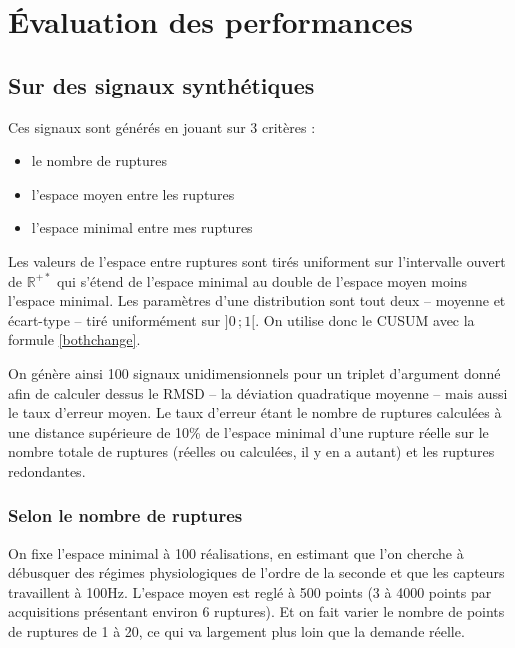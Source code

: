 \documentclass[french,11pt,notitlepage]{report}
\begin{document}
	\chapter{Évaluation des performances}
	
	
	
	\section{Sur des signaux synthétiques}
	
	Ces signaux sont générés en jouant sur 3 critères :
	
	\begin{itemize}
	\item le nombre de ruptures
	\item l'espace moyen entre les ruptures
	\item l'espace minimal entre mes ruptures\\
	\end{itemize}
	
	Les valeurs de l'espace entre ruptures sont tirés uniforment sur l'intervalle ouvert de $\mathbb R^{+*}$ qui s'étend de l'espace minimal au double de l'espace moyen moins l'espace minimal.
	Les paramètres d'une distribution sont tout deux -- moyenne et écart-type -- tiré uniformément sur $]0\,;1[$.
	On utilise donc le CUSUM avec la formule \ref{bothchange}.
	
	On génère ainsi 100 signaux unidimensionnels pour un triplet d'argument donné afin de calculer dessus le RMSD -- la déviation quadratique moyenne --
	 mais aussi le taux d'erreur moyen.
	Le taux d'erreur étant le nombre de ruptures calculées à une distance supérieure de 10\% de l'espace minimal d'une rupture réelle sur le nombre totale de ruptures (réelles ou calculées, il y en a autant) et les ruptures redondantes.
	
	
	\subsection{Selon le nombre de ruptures}
	
	
	On fixe l'espace minimal à 100 réalisations, en estimant que l'on cherche à débusquer des régimes physiologiques de l'ordre de la seconde et que les capteurs travaillent à 100Hz.
	L'espace moyen est reglé à 500 points (3 à 4000 points par acquisitions présentant environ 6 ruptures).
	Et on fait varier le nombre de points de ruptures de 1 à 20, ce qui va largement plus loin que la demande réelle.
	\\
	
\end{document}
